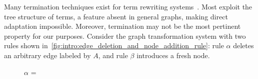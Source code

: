 Many termination techniques exist for term rewriting systems~\cite{nipkow1998term, dershowitz1982orderings, middeldorp1997simple, arts2000termination,contejean2005mechanically,urbain2004modular,contejean2011automated,giesl2014proving}.  
Most exploit the tree structure of terms, a feature absent in general graphs, making direct adaptation impossible. 
Moreover, termination may not be the most pertinent property for our purposes. Consider the graph transformation system with two rules shown in~\autoref{fig:intro:edge_deletion_and_node_addition_rule}: rule $\alpha$ deletes an arbitrary edge labeled by $A$, and rule $\beta$ introduces a fresh node.
  \begin{figure}[H]
        \centering
        $\alpha$ = {
        }
    

\end{figure}
